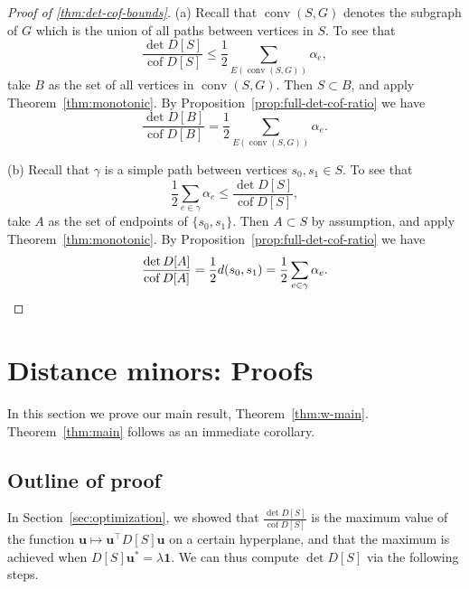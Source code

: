 \documentclass{amsart}
\theoremstyle{definition}
\newcommand{\bone}{\mathbf{1}}
\newcommand{\boldu}{\mathbf{u}}
\newcommand{\tr}{\intercal}
\DeclareMathOperator{\cof}{cof}
\DeclareMathOperator{\conv}{conv}
\begin{document}
\begin{proof}[Proof of \ref{thm:det-cof-bounds}]
(a)
Recall that $\conv(S, G)$ denotes the subgraph of $G$ which is the union of all paths between vertices in $S$.
To see that
\begin{equation*}
 \frac{\det D[S]}{\cof D[S]} \leq \frac12 \sum_{E(\conv(S, G))} \alpha_e ,
\end{equation*}
take $B$ as the set of all vertices in $\conv(S, G)$.
Then $S \subset B$, and apply Theorem~\ref{thm:monotonic}.
By Proposition~\ref{prop:full-det-cof-ratio} we have
\[
 \frac{\det D[B]}{\cof D[B]} = \frac12 \sum_{E(\conv(S, G))} \alpha_e .
\]

(b) 
Recall that $\gamma$ is a simple path between vertices $s_0, s_1 \in S$.
To see that
\begin{equation*}
	\frac12 \sum_{e \in \gamma} \alpha_e \leq \frac{\det D[S]}{\cof D[S]},
\end{equation*}
take $A$ as the set of endpoints of $\{s_0, s_1\}$.
Then $A \subset S$ by assumption, and apply Theorem~\ref{thm:monotonic}.
By Proposition~\ref{prop:full-det-cof-ratio} we have
\[
	\frac{\det D[A]}{\cof D[A]}
	= \frac12 d(s_0, s_1) 
	= \frac12 \sum_{e \in \gamma} \alpha_e .
	\qedhere
\]
\end{proof}


\section{Distance minors: Proofs}
In this section we prove our main result, Theorem~\ref{thm:w-main}.
Theorem~\ref{thm:main} follows as an immediate corollary.

\subsection{Outline of proof} 

In Section~\ref{sec:optimization}, we showed that $\displaystyle \frac{\det D[S]}{\cof D[S]}$ is the maximum value of the function $\boldu \mapsto \boldu^\tr D[S] \boldu$ on a certain hyperplane,
and that the maximum is achieved when $D[S] \boldu^* = \lambda \bone$.
We can thus compute $\det D[S]$ via the following steps.
\end{document}
